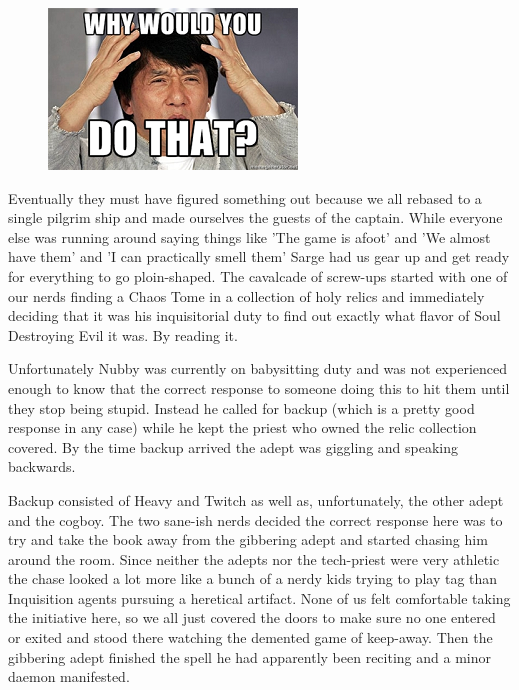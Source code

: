 \begin{figure}
	\begin{center}
		\includegraphics[width=\figwidth]{pics/2/7.png}
	\end{center}
\end{figure}
Eventually they must have figured something out because we all rebased to a single pilgrim ship and made ourselves the guests of the captain. 
While everyone else was running around saying things like 'The game is afoot' and 'We almost have them' and 'I can practically smell them' Sarge had us gear up and get ready for everything to go ploin-shaped. 
The cavalcade of screw-ups started with one of our nerds finding a Chaos Tome in a collection of holy relics and immediately deciding that it was his inquisitorial duty to find out exactly what flavor of Soul Destroying Evil it was. 
By reading it. 

Unfortunately  Nubby was currently on babysitting duty and was not experienced enough to know that the correct response to someone doing this to hit them until they stop being stupid. 
Instead he called for backup (which is a pretty good response in any case) while he kept the priest who owned the relic collection covered. By the time backup arrived the adept was giggling and speaking backwards.

Backup consisted of Heavy and Twitch as well as, unfortunately, the other adept and the cogboy. 
The two sane-ish nerds decided the correct response here was to try and take the book away from the gibbering adept and started chasing him around the room.
Since neither the adepts nor the tech-priest were very athletic the chase looked a lot more like a bunch of a nerdy kids trying to play tag than Inquisition agents pursuing a heretical artifact. 
None of us felt comfortable taking the initiative here, so we all just covered the doors to make sure no one entered or exited and stood there watching the demented game of keep-away. 
Then the gibbering adept finished the spell he had apparently been reciting and a minor daemon manifested.

